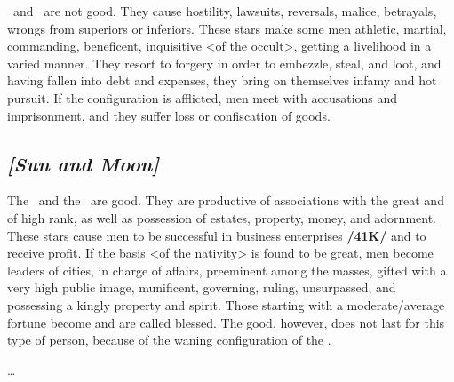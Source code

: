 \Mercury\, and \Mars\, are not good. They cause hostility, lawsuits, reversals, malice, betrayals, wrongs from superiors or inferiors. These stars make some men athletic, martial, commanding, beneficent, inquisitive <of the occult>, getting a livelihood in a varied manner. They resort to forgery in order to embezzle, steal, and loot, and having fallen into debt and expenses, they bring on themselves infamy and hot pursuit. If the configuration is afflicted, men meet with accusations and imprisonment, and they suffer loss or confiscation of goods.

\secbr
{}
\subsection{\textit{[Sun and Moon]}}
The \Sun\, and the \Moon\, are good. They are productive of associations with the great and of high rank, as well as possession of estates, property, money, and adornment. These stars cause men to be successful in business enterprises \textbf{/41K/} and to receive profit. If the basis <of the nativity> is found to be great, men become leaders of cities, in charge of affairs, preeminent among the masses, gifted with a very high public image, munificent, governing, ruling, unsurpassed, and possessing a kingly property and spirit. Those starting with a moderate/average fortune become  and are called blessed. The good, however, does not last for this type of person, because of the waning configuration of the \Moon. 

\ldots


\newpage